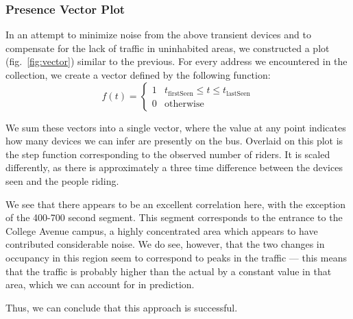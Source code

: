 \subsubsection*{Presence Vector Plot}

In an attempt to minimize noise from the above transient devices and to compensate for the lack of traffic in uninhabited areas, we constructed a plot (fig.~\ref{fig:vector}) similar to the previous. 
For every address we encountered in the collection, we create a vector defined by the following function:
\begin{equation*}
  f(t) = \begin{cases}
    1 & t_{\text{firstSeen}} \le t \le t_{\text{lastSeen}}\\
    0 & \text{otherwise}
  \end{cases}
\end{equation*}

We sum these vectors into a single vector, where the value at any point indicates how many devices we can infer are presently on the bus.
Overlaid on this plot is the step function corresponding to the observed number of riders.
It is scaled differently, as there is approximately a three time difference between the devices seen and the people riding.

We see that there appears to be an excellent correlation here, with the exception of the 400-700 second segment. %
This segment corresponds to the entrance to the College Avenue campus, a highly concentrated area which appears to have contributed considerable noise.
We do see, however, that the two changes in occupancy in this region seem to correspond to peaks in the traffic --- this means that the traffic is probably higher than the actual by a constant value in that area, which we can account for in prediction.
		
Thus, we can conclude that this approach is successful. %

